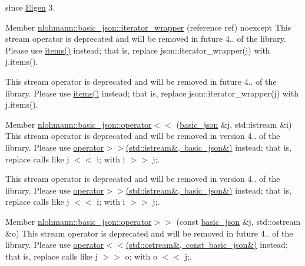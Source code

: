 \begin{DoxyRefList}
\label{deprecated__deprecated000385}%
%
since \mbox{\hyperlink{namespace_eigen}{Eigen}} 3.  
\item[Member \mbox{\hyperlink{classnlohmann_1_1basic__json_a0a8051760196ac813fd5eb3c8d5a2976}{nlohmann::basic\+\_\+json::iterator\+\_\+wrapper}} (reference ref) noexcept]\label{deprecated__deprecated000256}%
%
This stream operator is deprecated and will be removed in future 4.. of the library. Please use \mbox{\hyperlink{classnlohmann_1_1basic__json_a5961446010dfc494e0c247b4e9026977}{items()}} instead; that is, replace {\ttfamily json\+::iterator\+\_\+wrapper(j)} with {\ttfamily j.\+items()}. 

\label{deprecated__deprecated000415}%
%
This stream operator is deprecated and will be removed in future 4.. of the library. Please use \mbox{\hyperlink{classnlohmann_1_1basic__json_a5961446010dfc494e0c247b4e9026977}{items()}} instead; that is, replace {\ttfamily json\+::iterator\+\_\+wrapper(j)} with {\ttfamily j.\+items()}.  
\item[Member \mbox{\hyperlink{classnlohmann_1_1basic__json_a60ca396028b8d9714c6e10efbf475af6}{nlohmann::basic\+\_\+json::operator$<$$<$}} (\mbox{\hyperlink{classnlohmann_1_1basic__json}{basic\+\_\+json}} \&j, std\+::istream \&i)]\label{deprecated__deprecated000258}%
%
This stream operator is deprecated and will be removed in version 4.. of the library. Please use \mbox{\hyperlink{classnlohmann_1_1basic__json_aaf363408931d76472ded14017e59c9e8}{operator$>$$>$(std\+::istream\&, basic\+\_\+json\&)}} instead; that is, replace calls like {\ttfamily j $<$$<$ i;} with {\ttfamily i $>$$>$ j;}. 

\label{deprecated__deprecated000417}%
%
This stream operator is deprecated and will be removed in version 4.. of the library. Please use \mbox{\hyperlink{classnlohmann_1_1basic__json_aaf363408931d76472ded14017e59c9e8}{operator$>$$>$(std\+::istream\&, basic\+\_\+json\&)}} instead; that is, replace calls like {\ttfamily j $<$$<$ i;} with {\ttfamily i $>$$>$ j;}.  
\item[Member \mbox{\hyperlink{classnlohmann_1_1basic__json_a34d6a60dd99e9f33b8273a1c8db5669b}{nlohmann::basic\+\_\+json::operator$>$$>$}} (const \mbox{\hyperlink{classnlohmann_1_1basic__json}{basic\+\_\+json}} \&j, std\+::ostream \&o)]\label{deprecated__deprecated000257}%
%
This stream operator is deprecated and will be removed in future 4.. of the library. Please use \mbox{\hyperlink{classnlohmann_1_1basic__json_a5e34c5435e557d0bf666bd7311211405}{operator$<$$<$(std\+::ostream\&, const basic\+\_\+json\&)}} instead; that is, replace calls like {\ttfamily j $>$$>$ o;} with {\ttfamily o $<$$<$ j;}. 


\end{DoxyRefList}

